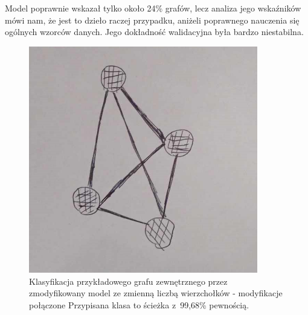 Model poprawnie wskazał tylko około 24\% grafów, lecz analiza jego wskaźników mówi nam,
że jest to dzieło raczej przypadku, aniżeli poprawnego nauczenia się ogólnych wzorców danych.
Jego dokładność walidacyjna była bardzo niestabilna.

\begin{figure}[ht]
	\centering
	\includegraphics[width=10cm]{../graph_classification/test_graphs/drawn/full-3.png}
	\caption{Klasyfikacja przykładowego grafu zewnętrznego przez zmodyfikowany model ze zmienną liczbą wierzchołków - modyfikacje połączone
		Przypisana klasa to ścieżka z~99,68\% pewnością.}
	\label{Fig:tests-cv-2d}
\end{figure}
\FloatBarrier